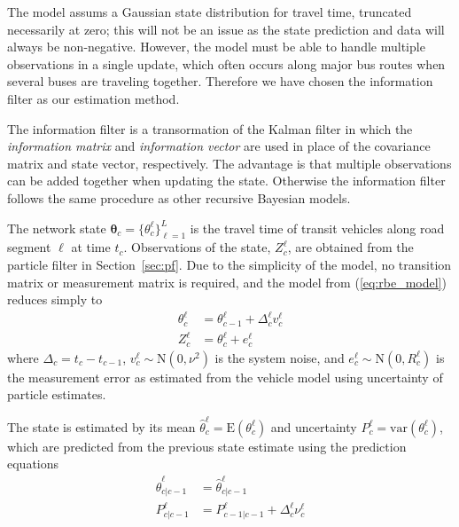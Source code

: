 The model assums a Gaussian state distribution for travel time,
truncated necessarily at zero;
this will not be an issue as the state prediction and data will always be non-negative.
However, the model must be able to handle multiple observations in a single update,
which often occurs along major bus routes when several buses are traveling together.
Therefore we have chosen the information filter as our estimation method.

The information filter is a transormation of the Kalman filter in which the
\emph{information matrix} and \emph{information vector} are used in place of 
the covariance matrix and state vector, respectively.
The advantage is that multiple observations can be added together when updating the state.
Otherwise the information filter follows the same procedure as other recursive Bayesian models.

The network state $\boldsymbol\theta_c = \{\theta_c^\ell\}_{\ell = 1}^L$ is the travel time 
of transit vehicles along road segment $\ell$ at time $t_c$.
Observations of the state, $Z_c^\ell$, are obtained from the particle filter 
in Section~\ref{sec:pf}.
Due to the simplicity of the model,
no transition matrix or measurement matrix is required,
and the model from (\ref{eq:rbe_model}) reduces simply to
\begin{equation}
\begin{split}
\theta_c^\ell &= \theta_{c-1}^\ell + \Delta_c^\ell v_c^\ell \\
Z_c^\ell &= \theta_c^\ell + e_c^\ell
\end{split}
\end{equation}
where $\Delta_c = t_c - t_{c-1}$,
$v_c^\ell \sim \mathrm{N}(0, \nu^2)$ is the system noise,
and $e_c^\ell \sim \mathrm{N}(0, R_c^\ell)$ is the measurement error
as estimated from the vehicle model using uncertainty of particle estimates.

The state is estimated by its mean $\hat \theta_c^\ell = \mathrm{E}(\theta_c^\ell)$
and uncertainty $P_c^\ell = \mathrm{var}(\theta_c^\ell)$,
which are predicted from the previous state estimate using the prediction
equations
\begin{align*}
\label{eq:kf_transition}
\hat \theta^\ell_{c|c-1} &= \hat \theta^\ell_{c|c-1} \\
P^\ell_{c|c-1} &= P^\ell_{c-1|c-1} + \Delta_c^\ell \nu_c^\ell
\end{align*}

